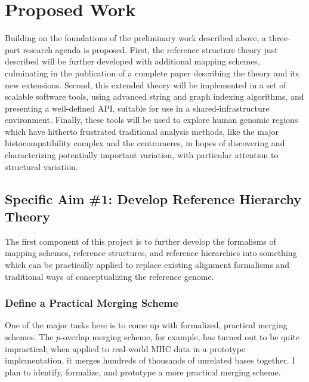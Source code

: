 \documentclass[11pt,proposal]{ucthesis}
\begin{document}




\chapter{Proposed Work}

Building on the foundations of the preliminary work described above, a three-part research agenda is proposed. First, the reference structure theory just described will be further developed with additional mapping schemes, culminating in the publication of a complete paper describing the theory and its new extensions. Second, this extended theory will be implemented in a set of scalable software tools, using advanced string and graph indexing algorithms, and presenting a well-defined API, suitable for use in a shared-infrastructure environment. Finally, these tools will be used to explore human genomic regions which have hitherto frustrated traditional analysis methods, like the major histocompatibility complex and the centromeres, in hopes of discovering and characterizing potentially important variation, with particular attention to structural variation.

\section{Specific Aim \#1: Develop Reference Hierarchy Theory}

The first component of this project is to further develop the formalisms of mapping schemes, reference structures, and reference hierarchies into something which can be practically applied to replace existing alignment formalisms and traditional ways of conceptualizing the reference genome.

\subsection{Define a Practical Merging Scheme}

One of the major tasks here is to come up with formalized, practical merging schemes. The $p$-overlap merging scheme, for example, has turned out to be quite impractical; when applied to real-world MHC data in a prototype implementation, it merges hundreds of thousands of unrelated bases together. I plan to identify, formalize, and prototype a more practical merging scheme.
\end{document}
